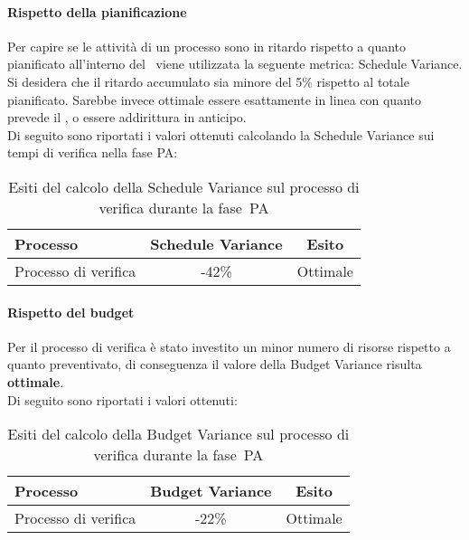 \documentclass[../PianoDiQualifica.tex]{subfiles}
\begin{document}
\begin{appendices}
			\paragraph{Rispetto della pianificazione}
			Per capire se le attività di un processo sono in ritardo rispetto a quanto pianificato all'interno del \pianodiprogetto\ viene utilizzata la seguente metrica: Schedule Variance.\\
			Si desidera che il ritardo accumulato sia minore del 5\% rispetto al totale pianificato. Sarebbe invece ottimale essere esattamente in linea con quanto prevede il \pianodiprogetto, o essere addirittura in anticipo.\\
			Di seguito sono riportati i valori ottenuti calcolando la Schedule Variance sui tempi di verifica nella fase PA:
			\begin{table}[H]
				\centering
				\begin{tabular}{l * {2}{c}}
					\toprule
					\textbf{Processo} & \textbf{Schedule Variance} & \textbf{Esito} \\
					\midrule
					Processo di verifica & -42\% &  Ottimale \\
					\bottomrule
				\end{tabular}
				\caption{Esiti del calcolo della Schedule Variance sul processo di verifica durante la fase\g\ PA}
				\label{tab:esiti_schedule_variance}
			\end{table}
			
			\paragraph{Rispetto del budget}
			Per il processo di verifica è stato investito un minor numero di risorse rispetto a quanto preventivato, di conseguenza il valore della Budget Variance risulta \textbf{ottimale}.\\
			Di seguito sono riportati i valori ottenuti:
			\begin{table}[H]
				\centering
				\begin{tabular}{l * {2}{c}}
					\toprule
					\textbf{Processo} & \textbf{Budget Variance} & \textbf{Esito} \\
					\midrule
					Processo di verifica & -22\% &  Ottimale \\
					\bottomrule
				\end{tabular}
				\caption{Esiti del calcolo della Budget Variance sul processo di verifica durante la fase\g\ PA}
				\label{tab:esiti_budget_variance}
			\end{table}
			

\end{appendices}
\end{document}
